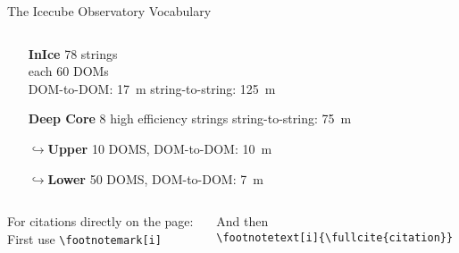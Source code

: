 \begin{frame}{The Icecube Observatory Vocabulary}
\begin{columns}
\begin{column}{.4\textwidth}
\begin{itemize}
                \item [\textbf{InIce}] 78 strings\\ each 60 DOMs\\ DOM-to-DOM: \SI{17}{\meter}
                      string-to-string: \SI{125}{\meter}
                \item [\textbf{Deep Core}] 8 high efficiency strings
                      string-to-string: \SI{75}{\meter}
                      \pause
                \item [\textbf{$\hookrightarrow$Upper}]  10 DOMS, DOM-to-DOM: \SI{10}{\meter}
                \item [\textbf{$\hookrightarrow$Lower}]  50 DOMS, DOM-to-DOM: \SI{7}{\meter}
            \end{itemize}
        \end{column}
        \hspace{-2em}
    \end{columns}
\end{frame}
\begin{frame}{}
    \begin{columns}[]
        \begin{column}{.5\textwidth}
            For citations directly on the page:\\
            First use \texttt{\small \backslash footnotemark[i]} \footnotemark[1]
        \end{column}
        \begin{column}{.5\linewidth}
            And then\\
            \texttt{\small \backslash footnotetext[i]\{\backslash fullcite\{citation\}\}}
        \end{column}
    \end{columns}

\end{frame}
